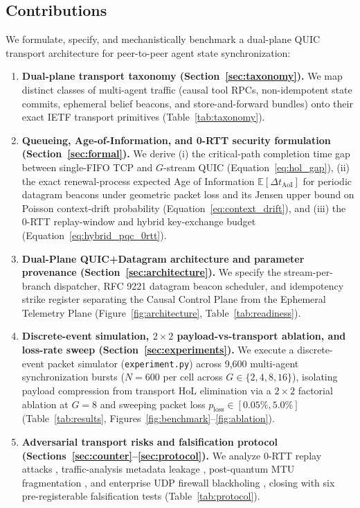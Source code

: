 \documentclass[11pt]{article}
\begin{document}
\subsection{Contributions}

We formulate, specify, and mechanistically benchmark a dual-plane QUIC transport architecture for peer-to-peer agent state synchronization:
\begin{enumerate}
  \item \textbf{Dual-plane transport taxonomy (Section~\ref{sec:taxonomy}).} We map distinct classes of multi-agent traffic (causal tool RPCs, non-idempotent state commits, ephemeral belief beacons, and store-and-forward bundles) onto their exact IETF transport primitives (Table~\ref{tab:taxonomy}).
  \item \textbf{Queueing, Age-of-Information, and 0-RTT security formulation (Section~\ref{sec:formal}).} We derive (i) the critical-path completion time gap between single-FIFO TCP and $G$-stream QUIC (Equation~\ref{eq:hol_gap}), (ii) the exact renewal-process expected Age of Information $\mathbb{E}[\Delta t_{\mathrm{AoI}}]$ for periodic datagram beacons under geometric packet loss and its Jensen upper bound on Poisson context-drift probability (Equation~\ref{eq:context_drift}), and (iii) the 0-RTT replay-window and hybrid key-exchange budget (Equation~\ref{eq:hybrid_pqc_0rtt}).
  \item \textbf{Dual-Plane QUIC+Datagram architecture and parameter provenance (Section~\ref{sec:architecture}).} We specify the stream-per-branch dispatcher, RFC 9221 datagram beacon scheduler, and idempotency strike register separating the Causal Control Plane from the Ephemeral Telemetry Plane (Figure~\ref{fig:architecture}, Table~\ref{tab:readiness}).
  \item \textbf{Discrete-event simulation, $2\times 2$ payload-vs-transport ablation, and loss-rate sweep (Section~\ref{sec:experiments}).} We execute a discrete-event packet simulator (\texttt{experiment.\linebreak[0]py}) across 9{,}600 multi-agent synchronization bursts ($N=600$ per cell across $G \in \{2,\allowbreak 4,\allowbreak 8,\allowbreak 16\}$), isolating payload compression from transport HoL elimination via a $2\times 2$ factorial ablation at $G=8$ and sweeping packet loss $p_{\mathrm{loss}} \allowbreak \in [0.05\%,\allowbreak 5.0\%]$ (Table~\ref{tab:results}, Figures~\ref{fig:benchmark}--\ref{fig:ablation}).
  \item \textbf{Adversarial transport risks and falsification protocol (Sections~\ref{sec:counter}--\ref{sec:protocol}).} We analyze 0-RTT replay attacks \citep{fischlin2024quic}, traffic-analysis metadata leakage \citep{arote2026renegade}, post-quantum MTU fragmentation \citep{commey2026matter}, and enterprise UDP firewall blackholing \citep{kuehlewind2022rfc9308}, closing with six pre-registerable falsification tests (Table~\ref{tab:protocol}).
\end{enumerate}
\end{document}
